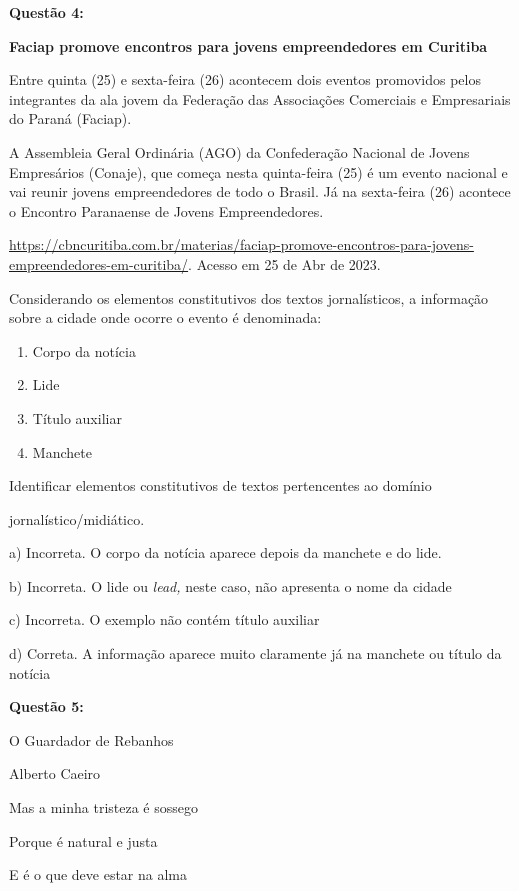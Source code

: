 \textbf{Questão 4:}

\textbf{Faciap promove encontros para jovens empreendedores em Curitiba}

Entre quinta (25) e sexta-feira (26) acontecem dois eventos promovidos
pelos integrantes da ala jovem da Federação das Associações Comerciais e
Empresariais do Paraná (Faciap).

A Assembleia Geral Ordinária (AGO) da Confederação Nacional de Jovens
Empresários (Conaje), que começa nesta quinta-feira (25) é um evento
nacional e vai reunir jovens empreendedores de todo o Brasil. Já na
sexta-feira (26) acontece o Encontro Paranaense de Jovens
Empreendedores.

\href{https://cbncuritiba.com.br/materias/faciap-promove-encontros-para-jovens-empreendedores-em-curitiba/}{{https://cbncuritiba.com.br/materias/faciap-promove-encontros-para-jovens-empreendedores-em-curitiba/}}.
Acesso em 25 de Abr de 2023.

Considerando os elementos constitutivos dos textos jornalísticos, a
informação sobre a cidade onde ocorre o evento é denominada:

\begin{enumerate}
\def\labelenumi{\alph{enumi})}
\item
  Corpo da notícia
\item
  Lide
\item
  Título auxiliar
\item
  Manchete
\end{enumerate}

Identificar elementos constitutivos de textos pertencentes ao domínio

jornalístico/midiático.

a) Incorreta. O corpo da notícia aparece depois da manchete e do lide.

b) Incorreta. O lide ou \emph{lead,} neste caso, não apresenta o nome da
cidade

c) Incorreta. O exemplo não contém título auxiliar

d) Correta. A informação aparece muito claramente já na manchete ou
título da notícia

\textbf{Questão 5:}

O Guardador de Rebanhos

Alberto Caeiro

Mas a minha tristeza é sossego

Porque é natural e justa

E é o que deve estar na alma

